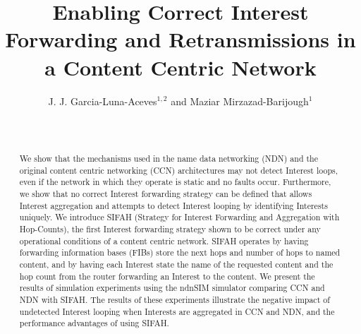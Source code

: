 \documentclass{ancs15-alternate}
\begin{document}
\title{
Enabling Correct Interest Forwarding and Retransmissions in a Content Centric Network} 

\author{
    \alignauthor
       J. J. Garcia-Luna-Aceves$^{1,2}$  and Maziar Mirzazad-Barijough$^1$\\
       \\
              \\
}
 
\maketitle



\begin{abstract}
We show that the mechanisms used in the name data networking (NDN) and the original content centric networking (CCN)  architectures may not detect Interest loops, even if the network in which they operate is  static and no faults occur. Furthermore, we show that no correct Interest forwarding strategy can be defined that allows Interest aggregation and attempts to
detect Interest looping by identifying Interests uniquely.  We introduce SIFAH (Strategy for Interest  Forwarding and Aggregation with Hop-Counts), the first Interest forwarding strategy shown to be correct under any operational conditions of a content centric network. SIFAH operates by  having forwarding information bases (FIBs) store the next hops and number of hops to named content, and by having each Interest state  the name of the requested content and the hop count from the router forwarding an Interest to the content.   We present the results of simulation experiments using the ndnSIM simulator comparing CCN and NDN with SIFAH. The results of these experiments illustrate the negative impact of undetected Interest looping when Interests are aggregated in CCN and NDN, and the performance advantages of using SIFAH.

\end{abstract}



\vspace{-0.08in}

\vspace{-0.08in}

\vspace{-0.08in}
\end{document}
